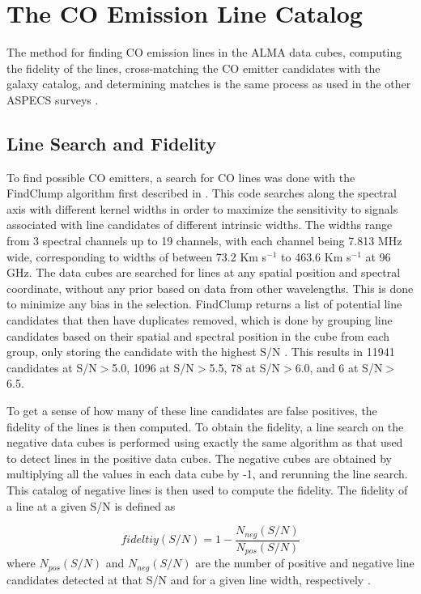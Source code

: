 \section{The CO Emission Line Catalog}

The method for finding CO emission lines in the ALMA data cubes, computing the fidelity of the lines, cross-matching the CO emitter candidates with the galaxy catalog, and determining matches is the same process as used in the other ASPECS surveys \cite{walter2016alma, decarli2019alma, gonzalez2019alma}.

\subsection{Line Search and Fidelity}

To find possible CO emitters, a search for CO lines was done with the FindClump algorithm first described in \cite{walter2016alma}. This code searches along the spectral axis with different kernel widths in order to maximize the sensitivity to signals associated with line candidates of different intrinsic widths. The widths range from 3 spectral channels up to 19 channels, with each channel being 7.813 MHz wide, corresponding to widths of between 73.2 Km s$^{-1}$ to 463.6 Km s$^{-1}$ at 96 GHz. The data cubes are searched for lines at any spatial position and spectral coordinate, without any prior based on data from other wavelengths. This is done to minimize any bias in the selection. FindClump returns a list of potential line candidates that then have duplicates removed, which is done by grouping line candidates based on their spatial and spectral position in the cube from each group, only storing the candidate with the highest S/N \cite{walter2016alma}. This results in 11941 candidates at S/N$>$5.0, 1096 at S/N$>$5.5, 78 at S/N$>$6.0, and 6 at S/N$>$6.5. 

To get a sense of how many of these line candidates are false positives, the fidelity of the lines is then computed. To obtain the fidelity, a line search on the negative data cubes is performed using exactly the same algorithm as that used to detect lines in the positive data cubes. The negative cubes are obtained by multiplying all the values in each data cube by -1, and rerunning the line search. This catalog of negative lines is then used to compute the fidelity. The fidelity of a line at a given S/N is defined as 

$$ fideltiy(S/N) = 1 - \frac{N_{neg}(S/N)}{N_{pos}(S/N)} $$ where $N_{pos}(S/N)$ and $N_{neg}(S/N)$ are the number of positive and negative line candidates detected at that S/N and for a given line width, respectively \cite{gonzalez2019alma}.


